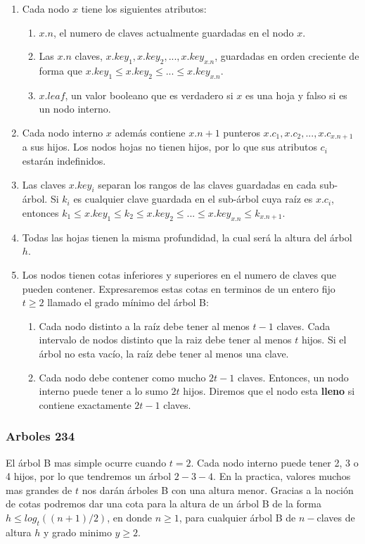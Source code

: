 \begin{enumerate}
 \item Cada nodo $x$ tiene los siguientes atributos:
 \begin{enumerate}
  \item $x.n$, el numero de claves actualmente guardadas en el nodo $x$.
  \item Las $x.n$ claves, $x.key_1, x.key_2, ..., x.key_{x.n}$, guardadas en orden creciente de forma que $x.key_1\leq x.key_2\leq ...\leq x.key_{x.n}$.
  \item $x.leaf$, un valor booleano que es verdadero si $x$ es una hoja y falso si es un nodo interno.
 \end{enumerate}
 \item Cada nodo interno $x$ adem\'as contiene $x.n+1$ punteros $x.c_1,x.c_2,...,x.c_{x.n+1}$ a sus hijos. Los nodos hojas no tienen hijos, por lo que sus atributos $c_i$ estar\'an indefinidos.
 \item Las claves $x.key_i$ separan los rangos de las claves guardadas en cada sub-\'arbol. Si $k_i$ es cualquier clave guardada en el sub-\'arbol cuya ra\'iz es $x.c_i$, entonces $k_1 \leq x.key_1 \leq k_2 \leq x.key_2 \leq ... \leq x.key_{x.n} \leq k_{x.n+1}$.
 \item Todas las hojas tienen la misma profundidad, la cual ser\'a la altura del \'arbol $h$.
 \item Los nodos tienen cotas inferiores y superiores en el numero de claves que pueden contener. Expresaremos estas cotas en terminos de un entero fijo $t \geq 2$ llamado el grado m\'inimo del \'arbol B:
 \begin{enumerate}
  \item Cada nodo distinto a la ra\'iz debe tener al menos $t-1$ claves. Cada intervalo de nodos distinto que la raiz debe tener al menos $t$ hijos. Si el \'arbol no esta vac\'io, la ra\'iz debe tener al menos una clave.
  \item Cada nodo debe contener como mucho $2t-1$ claves. Entonces, un nodo interno puede tener a lo sumo $2t$ hijos. Diremos que el nodo esta \textbf{lleno} si contiene exactamente $2t - 1$ claves.
 \end{enumerate}
\end{enumerate}

\subsubsection{Arboles 234}
El \'arbol B mas simple ocurre cuando $t=2$. Cada nodo interno puede tener 2, 3 o 4 hijos, por lo que tendremos un \'arbol $2-3-4$. En la practica, valores muchos mas grandes de $t$ nos dar\'an \'arboles B con una altura menor. Gracias a la noci\'on de cotas podremos dar una cota para la altura de un \'arbol B de la forma $h \leq log_t((n+1)/2)$, en donde $n \geq 1$, para cualquier \'arbol B de $n-$claves de altura $h$ y grado minimo $y \geq 2$.

